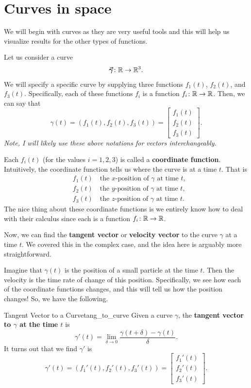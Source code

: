         
        \section{Curves in space}
        
        We will begin with curves as they are very useful tools and this will help us visualize results for the other types of functions. 
        
        Let us consider a curve
        \[
        \boldsymbol{\vec{\gamma}} \colon \mathbb{R} \to \mathbb{R}^3.
        \]
        We will specify a specific curve by supplying three functions $f_1(t)$, $f_2(t)$, and $f_3(t)$. Specifically, each of these functions $f_i$ is a function $f_i\colon \mathbb{R} \to \mathbb{R}$. Then, we can say that
        \[
        \gamma(t)=(f_1(t),f_2(t),f_3(t))=\begin{bmatrix} f_1(t)\\ f_2(t)\\ f_3(t)\end{bmatrix}.
        \]
        \emph{Note, I will likely use these above notations for vectors interchangeably.} 
        
        Each $f_i(t)$ (for the values $i=1,2,3$) is called a \textbf{coordinate function}.  Intuitively, the coordinate function tells us where the curve is at a time $t$. That is
        \begin{align*}
            &f_1(t) \quad \textrm{the $x$-position of $\gamma$ at time $t$,}\\
            &f_2(t) \quad \textrm{the $y$-position of $\gamma$ at time $t$,}\\
            &f_3(t) \quad \textrm{the $z$-position of $\gamma$ at time $t$.}
        \end{align*}
        The nice thing about these coordinate functions is we entirely know how to deal with their calculus since each is a function $f_i\colon \mathbb{R} \to \mathbb{R}$.
        
        Now, we can find the \textbf{tangent vector} or \textbf{velocity vector} to the curve $\gamma$ at a time $t$.  We covered this in the complex case, and the idea here is arguably more straightforward. 
        
        Imagine that $\gamma(t)$ is the position of a small particle at the time $t$.  Then the velocity is the time rate of change of this position.  Specifically, we see how each of the coordinate functions changes, and this will tell us how the position changes! So, we have the following.
        
        \begin{df}{Tangent Vector to a Curve}{tang_to_curve}
        Given a curve $\gamma$, the \textbf{tangent vector to $\gamma$ at the time $t$} is
        \[
        \gamma'(t)=\lim_{\delta \to 0} \frac{\gamma(t+\delta)-\gamma(t)}{\delta}.
        \]
        It turns out that we find $\gamma'$ is
        \[
        \gamma'(t)=(f_1'(t),f_2'(t),f_3'(t))=\begin{bmatrix} f_1'(t)\\ f_2'(t)\\ f_3'(t)\end{bmatrix}.
        \]
        \end{df}
        
